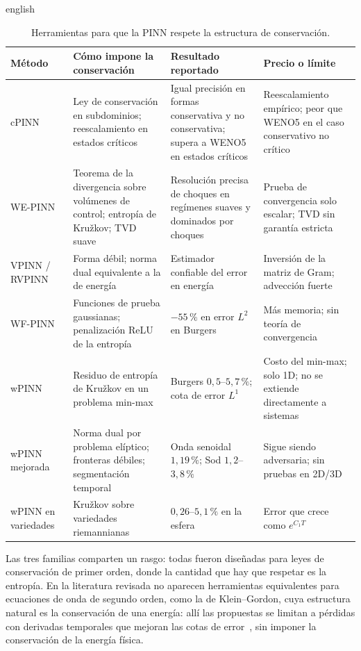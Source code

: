 \documentclass[../0000.tex]{subfiles}
\begin{document}
\begin{hyphenrules}{english}
\begin{table}[htbp]
\centering\small
\caption{Herramientas para que la PINN respete la estructura de conservación.}
\label{tab:ea-cons}
\begin{tabularx}{\textwidth}{@{}l Y Y Y@{}}
\toprule
Método & Cómo impone la conservación & Resultado reportado & Precio o límite \\
\midrule
cPINN~\cite{jagtap2020conservative,quita2023conservative} & Ley de conservación en subdominios; reescalamiento en estados críticos & Igual precisión en formas conservativa y no conservativa; supera a WENO5 en estados críticos & Reescalamiento empírico; peor que WENO5 en el caso conservativo no crítico \\
WE-PINN~\cite{oubarka2026weak} & Teorema de la divergencia sobre volúmenes de control; entropía de Kružkov; TVD suave & Resolución precisa de choques en regímenes suaves y dominados por choques & Prueba de convergencia solo escalar; TVD sin garantía estricta \\
VPINN / RVPINN~\cite{kharazmi2019vpinns,rojas2024robust} & Forma débil; norma dual equivalente a la de energía & Estimador confiable del error en energía & Inversión de la matriz de Gram; advección fuerte \\
WF-PINN~\cite{wang2025wf} & Funciones de prueba gaussianas; penalización ReLU de la entropía & $-55\,\%$ en error $L^2$ en Burgers & Más memoria; sin teoría de convergencia \\
wPINN~\cite{de2024wpinns} & Residuo de entropía de Kružkov en un problema min-max & Burgers $0{,}5$--$5{,}7\,\%$; cota de error $L^1$ & Costo del min-max; solo 1D; no se extiende directamente a sistemas \\
wPINN mejorada~\cite{chaumet2024improving} & Norma dual por problema elíptico; fronteras débiles; segmentación temporal & Onda senoidal $1{,}19\,\%$; Sod $1{,}2$--$3{,}8\,\%$ & Sigue siendo adversaria; sin pruebas en 2D/3D \\
wPINN en variedades~\cite{zhou2025weak} & Kružkov sobre variedades riemannianas & $0{,}26$--$5{,}1\,\%$ en la esfera & Error que crece como $e^{C_1T}$ \\
\bottomrule
\end{tabularx}
\end{table}

Las tres familias comparten un rasgo: todas fueron diseñadas para leyes de conservación de primer orden, donde la cantidad que hay que respetar es la entropía. En la literatura revisada no aparecen herramientas equivalentes para ecuaciones de onda de segundo orden, como la de Klein--Gordon, cuya estructura natural es la conservación de una energía: allí las propuestas se limitan a pérdidas con derivadas temporales que mejoran las cotas de error~\cite{qian2023error}, sin imponer la conservación de la energía física.


\end{hyphenrules}
\end{document}
